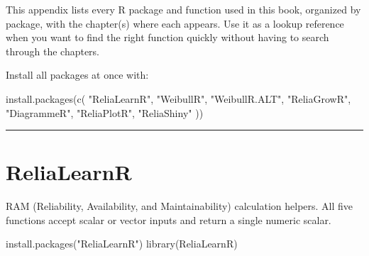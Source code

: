 \documentclass[
  letterpaper,
  DIV=11,
  numbers=noendperiod]{scrreprt}
\newenvironment{Shaded}{\begin{snugshade}}{\end{snugshade}}
\newcommand{\FunctionTok}[1]{\textcolor[rgb]{0.28,0.35,0.67}{#1}}
\newcommand{\NormalTok}[1]{\textcolor[rgb]{0.00,0.23,0.31}{#1}}
\newcommand{\StringTok}[1]{\textcolor[rgb]{0.13,0.47,0.30}{#1}}
\begin{document}

This appendix lists every R package and function used in this book,
organized by package, with the chapter(s) where each appears. Use it as
a lookup reference when you want to find the right function quickly
without having to search through the chapters.

Install all packages at once with:

\begin{Shaded}
\begin{Highlighting}[]
\FunctionTok{install.packages}\NormalTok{(}\FunctionTok{c}\NormalTok{(}
  \StringTok{"ReliaLearnR"}\NormalTok{,}
  \StringTok{"WeibullR"}\NormalTok{,}
  \StringTok{"WeibullR.ALT"}\NormalTok{,}
  \StringTok{"ReliaGrowR"}\NormalTok{,}
  \StringTok{"DiagrammeR"}\NormalTok{,}
  \StringTok{"ReliaPlotR"}\NormalTok{,}
  \StringTok{"ReliaShiny"}
\NormalTok{))}
\end{Highlighting}
\end{Shaded}

\begin{center}\rule{0.5\linewidth}{0.5pt}\end{center}

\section*{ReliaLearnR}\label{relialearnr}


RAM (Reliability, Availability, and Maintainability) calculation
helpers. All five functions accept scalar or vector inputs and return a
single numeric scalar.

\begin{Shaded}
\begin{Highlighting}[]
\FunctionTok{install.packages}\NormalTok{(}\StringTok{"ReliaLearnR"}\NormalTok{)}
\FunctionTok{library}\NormalTok{(ReliaLearnR)}
\end{Highlighting}
\end{Shaded}
\end{document}
